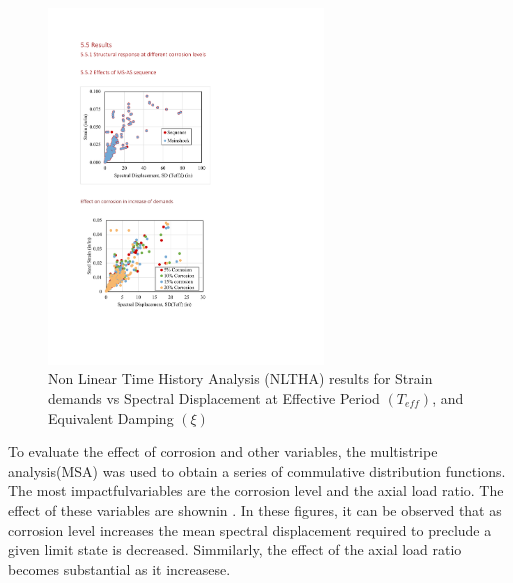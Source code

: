 \begin{figure}[htbp]
	\centering
	\includegraphics[width=0.65\textwidth]{VAC Thesis 2.0/Chapter-5/figs/All_results_NLTHA_Figure.pdf}
	\caption{Non Linear Time History Analysis (NLTHA) results for Strain demands vs Spectral Displacement at Effective Period $(T_{eff})$, and Equivalent Damping $(\xi)$}
	\label{fig:all_results_nltha}
\end{figure}

To evaluate the effect of corrosion and other variables, the multistripe analysis(MSA) was used to obtain a series of commulative distribution functions. The most impactfulvariables are the corrosion level and the axial load ratio. The effect of these variables are shownin . In these figures, it can be observed that as corrosion level increases the mean spectral displacement required to preclude a given limit state is decreased. Simmilarly, the effect of the axial load ratio becomes substantial as it increasese.

